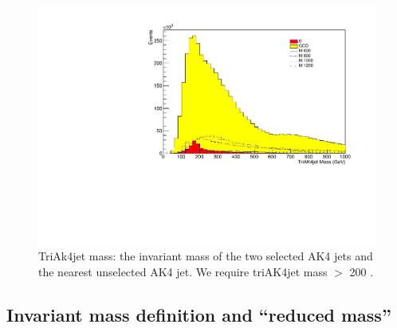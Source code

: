 \begin{figure}[h]
\begin{center}
\includegraphics[scale=0.5]{F5/shapeinvmsnAK4cl.pdf}
\end{center}
\caption{TriAk4jet mass: the invariant mass of the two selected AK4 jets and the nearest unselected AK4 jet. We require triAK4jet mass $>$ 200 \GeV.}
\label{fig:triak4jetm}
\end{figure} 


\subsection{Invariant mass definition and ``reduced mass''\label{sss:DijetMassDef}}


